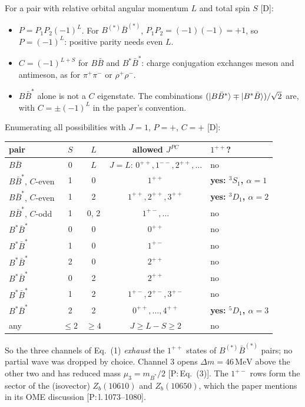 \documentclass[11pt,a4paper]{article}
\newcommand{\tagP}[1]{\textcolor{blue!65!black}{\textsf{\small[P:\,#1]}}}
\newcommand{\tagD}{\textcolor{orange!85!black}{\textsf{\small[D]}}}
\renewcommand{\MeV}{\,\mathrm{MeV}}
\begin{document}
For a pair with relative orbital angular momentum $L$ and total spin $S$ \tagD:
\begin{itemize}
\item $P=P_1P_2(-1)^L$. For $B^{(*)}\bar B^{(*)}$, $P_1P_2=(-1)(-1)=+1$, so $P=(-1)^L$: positive parity needs even $L$.
\item $C=(-1)^{L+S}$ for $B\bar B$ and $B^*\bar B^*$: charge conjugation exchanges meson and antimeson, as for $\pi^+\pi^-$ or $\rho^+\rho^-$.
\item $B\bar B^*$ alone is not a $C$ eigenstate. The combinations $(\ket{B\bar B^*}\mp\ket{B^*\bar B})/\sqrt2$ are, with $C=\pm(-1)^L$ in the paper's convention.
\end{itemize}
Enumerating all possibilities with $J=1$, $P=+$, $C=+$ \tagD:
\begin{center}
\small
\begin{tabular}{lcccl}
\toprule
pair & $S$ & $L$ & allowed $J^{PC}$ & $1^{++}$?\\
\midrule
$B\bar B$ & 0 & $L$ & $J=L$: $0^{++},1^{--},2^{++},\dots$ & no\\
$B\bar B^*$, $C$-even & 1 & 0 & $1^{++}$ & \textbf{yes: $^3S_1$, $\alpha=1$}\\
$B\bar B^*$, $C$-even & 1 & 2 & $1^{++},2^{++},3^{++}$ & \textbf{yes: $^3D_1$, $\alpha=2$}\\
$B\bar B^*$, $C$-odd & 1 & 0, 2 & $1^{+-},\dots$ & no\\
$B^*\bar B^*$ & 0 & 0 & $0^{++}$ & no\\
$B^*\bar B^*$ & 1 & 0 & $1^{+-}$ & no\\
$B^*\bar B^*$ & 2 & 0 & $2^{++}$ & no\\
$B^*\bar B^*$ & 0 & 2 & $2^{++}$ & no\\
$B^*\bar B^*$ & 1 & 2 & $1^{+-},2^{+-},3^{+-}$ & no\\
$B^*\bar B^*$ & 2 & 2 & $0^{++},\dots,4^{++}$ & \textbf{yes: $^5D_1$, $\alpha=3$}\\
any & $\le2$ & $\ge4$ & $J\ge L-S\ge2$ & no\\
\bottomrule
\end{tabular}
\end{center}
So the three channels of Eq.~(1) \emph{exhaust} the $1^{++}$ states of $B^{(*)}\bar B^{(*)}$ pairs; no partial wave was dropped by choice. Channel 3 opens $\Delta m=46\MeV$ above the other two and has reduced mass $\mu_3=m_{B^*}/2$ \tagP{Eq.~(3)}. The $1^{+-}$ rows form the sector of the (isovector) $Z_b(10610)$ and $Z_b(10650)$, which the paper mentions in its OME discussion \tagP{l.\,1073--1080}.
\end{document}
